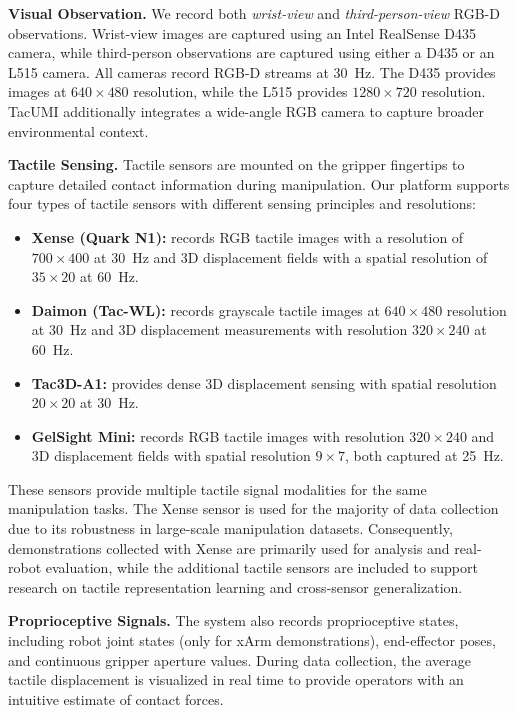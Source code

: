 \noindent \textbf{Visual Observation.}
We record both \emph{wrist-view} and \emph{third-person-view} RGB-D observations. Wrist-view images are captured using an Intel RealSense D435 camera, while third-person observations are captured using either a D435 or an L515 camera. All cameras record RGB-D streams at 30~Hz. The D435 provides images at $640\times480$ resolution, while the L515 provides $1280\times720$ resolution. TacUMI additionally integrates a wide-angle RGB camera to capture broader environmental context.

\noindent \textbf{Tactile Sensing.}
Tactile sensors are mounted on the gripper fingertips to capture detailed contact information during manipulation. Our platform supports four types of tactile sensors with different sensing principles and resolutions:

\begin{itemize}

\item \textbf{Xense (Quark N1):}
records RGB tactile images with a resolution of $700\times400$ at 30~Hz and 3D displacement fields with a spatial resolution of $35\times20$ at 60~Hz.

\item \textbf{Daimon (Tac-WL):}
records grayscale tactile images at $640\times480$ resolution at 30~Hz and 3D displacement measurements with resolution $320\times240$ at 60~Hz.

\item \textbf{Tac3D-A1:}
provides dense 3D displacement sensing with spatial resolution $20\times20$ at 30~Hz.

\item \textbf{GelSight Mini:}
records RGB tactile images with resolution $320\times240$ and 3D displacement fields with spatial resolution $9\times7$, both captured at 25~Hz.

\end{itemize}

These sensors provide multiple tactile signal modalities for the same manipulation tasks. The Xense sensor is used for the majority of data collection due to its robustness in large-scale manipulation datasets. 
Consequently, demonstrations collected with Xense are primarily used for analysis and real-robot evaluation, while the additional tactile sensors are included to support research on tactile representation learning and cross-sensor generalization.

\noindent \textbf{Proprioceptive Signals.}
The system also records proprioceptive states, including robot joint states (only for xArm demonstrations), end-effector poses, and continuous gripper aperture values. During data collection, the average tactile displacement is visualized in real time to provide operators with an intuitive estimate of contact forces.


